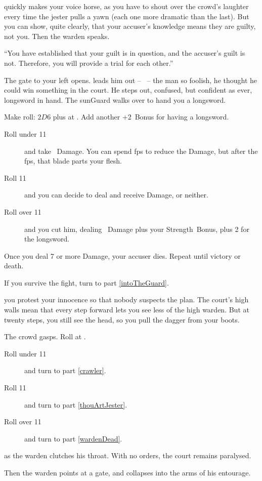 quickly makes your voice horse, as you have to shout over the crowd's laughter every time the jester pulls a yawn (each one more dramatic than the last).
But you can show, quite clearly, that your accuser's knowledge means they are guilty, not you.
Then the \gls{warden} speaks.

``You have established that your guilt is in question, and the accuser's guilt is not.
Therefore, you will provide a trial for each other.''

The gate to your left opens.
 leads him out -- \composeHumanName\ -- the man so foolish, he thought he could win something in the \gls{court}.
He steps out, confused, but confident as ever, longsword in hand.
The \gls{sunGuard} walks over to hand you a longsword.

Make  roll: $2D6$ plus  at \tn[11].
Add another +2~Bonus for having a longsword.

\begin{description}
  \item[Roll under 11]
  and take ~Damage.
  You can spend \glspl{fp} to reduce the Damage, but after the \glspl{fp}, that blade parts your flesh.
  \item[Roll 11]
  and you can decide to deal and receive Damage, or neither.
  \item[Roll over 11]
  and you cut him, dealing ~Damage plus your Strength~Bonus, plus 2 for the longsword.
\end{description}

Once you deal 7 or more Damage, your accuser dies.
Repeat until victory or death.

If you survive the fight, turn to part \vref{intoTheGuard}.

you protest your innocence so that nobody suspects the plan.
The \gls{court}'s high walls mean that every \gls{step} forward lets you see less of the high \gls{warden}.
But at twenty \glspl{step}, you still see the head, so you pull the dagger from your boots.

The crowd gasps.
Roll  at \tn[11].

\begin{description}
  \item[Roll under 11]
  and turn to part \vref{crawler}.
  \item[Roll 11]
  and turn to part \vref{thouArtJester}.
  \item[Roll over 11]
  and turn to part \vref{wardenDead}.
\end{description}

as the \gls{warden} clutches his throat.
With no orders, the \gls{court} remains paralysed.

Then the \gls{warden} points at a gate, and collapses into the arms of his entourage.
